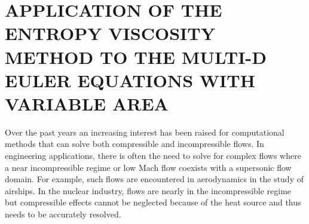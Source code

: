 %
%
%


\chapter{\uppercase {Application of the entropy viscosity method to the multi-D Euler equations with variable area}}\label{chap:euler}
Over the past years an increasing interest has been raised for computational methods that can solve both compressible and incompressible flows. In engineering applications, there is often the need to solve for complex flows where a near incompressible regime or low Mach flow coexists with a supersonic flow domain. For example, such flows are encountered in aerodynamics in the study of airships. In the nuclear industry, flows are nearly in the incompressible regime but compressible effects cannot be neglected because of the heat source and thus needs to be accurately resolved. \\
